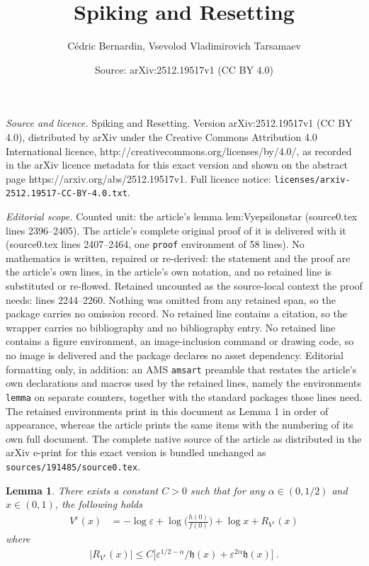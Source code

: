 \documentclass[10pt,a4paper]{amsart}
\title{Spiking and Resetting}
\author{C\'edric Bernardin, Vsevolod Vladimirovich Tarsamaev}
\date{Source: arXiv:2512.19517v1 (CC BY 4.0)}
\newtheorem{lemma}{Lemma}
\begin{document}
\maketitle

\noindent\emph{Source and licence.} Spiking and Resetting. Version arXiv:2512.19517v1 (CC BY 4.0), distributed by arXiv under the Creative Commons Attribution 4.0 International licence, http://creativecommons.org/licenses/by/4.0/, as recorded in the arXiv licence metadata for this exact version and shown on the abstract page https://arxiv.org/abs/2512.19517v1. Full licence notice: \texttt{licenses/arxiv-2512.19517-CC-BY-4.0.txt}.\par\smallskip

\noindent\textit{Editorial scope.} Counted unit: the article's lemma lem:Vyepsilonstar (source0.tex lines 2396--2405). The article's complete original proof of it is delivered with it (source0.tex lines 2407--2464, one \texttt{proof} environment of 58 lines). No mathematics is written, repaired or re-derived: the statement and the proof are the article's own lines, in the article's own notation, and no retained line is substituted or re-flowed.  Retained uncounted as the source-local context the proof needs: lines 2244--2260.  Nothing was omitted from any retained span, so the package carries no omission record.  No retained line contains a citation, so the wrapper carries no bibliography and no bibliography entry.  No retained line contains a figure environment, an image-inclusion command or drawing code, so no image is delivered and the package declares no asset dependency.  Editorial formatting only, in addition: an AMS \texttt{amsart} preamble that restates the article's own declarations and macros used by the retained lines, namely the environments \texttt{lemma} on separate counters, together with the standard packages those lines need.  The retained environments print in this document as Lemma 1 in order of appearance, whereas the article prints the same items with the numbering of its own full document.  The complete native source of the article as distributed in the arXiv e-print for this exact version is bundled unchanged as \texttt{sources/191485/source0.tex}.
\begin{lemma}
\label{lem:expV}
There exists a constant $C>0$ such that for any $\alpha \in (0,1/2)$ and $x\in (0,1)$, the following holds
\begin{equation}
\label{eq:exp-Vvarepsilon}
\begin{split}
V^\varepsilon(x) &= - \log \varepsilon +  \log \Big(\frac{h(0)}{f(0)} \Big)  +  \log x + R_{V^\varepsilon} (x) 
\end{split}
\end{equation}
where 
\begin{equation}
\begin{split}
\vert R_{V^\varepsilon} (x) \vert \le C \big[ \varepsilon^{1/2 - \alpha}/{\mathfrak  h}(x) + \varepsilon^{2\alpha} {\mathfrak h}(x)  \big] \ .
\end{split}
\end{equation}
\end{lemma}
\end{document}
